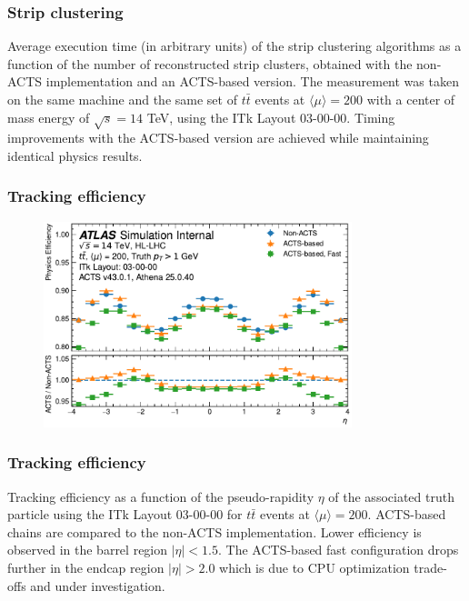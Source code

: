 \documentclass[aspectratio=169]{beamer}
\begin{document}
\begin{frame}
\frametitle{Strip clustering}
Average execution time (in arbitrary units) of the strip clustering algorithms as a function of the number of reconstructed strip clusters, obtained with the non-ACTS implementation and an ACTS-based version. The measurement was taken on the same machine and the same set of $t\bar{t}$ events at $\langle \mu \rangle = 200$ with a center of mass energy of $\sqrt{s}=14$ TeV, using the ITk Layout 03-00-00. Timing improvements with the ACTS-based version are achieved while maintaining identical physics results.
\end{frame}


\begin{frame}
\frametitle{Tracking efficiency}
\begin{figure}[h]
    \centering
    \includegraphics[width=0.8\textwidth]{plots/tracking_efficiency_physics.pdf}
\end{figure}
\end{frame}

\begin{frame}
\frametitle{Tracking efficiency}
Tracking efficiency as a function of the pseudo-rapidity $\eta$ of the associated truth particle using the ITk Layout 03-00-00 for $t\bar{t}$ events at $\langle \mu \rangle = 200$. ACTS-based chains are compared to the non-ACTS implementation. Lower efficiency is observed in the barrel region $|\eta| < 1.5$. The ACTS-based fast configuration drops further in the endcap region $|\eta| > 2.0$ which is due to CPU optimization trade-offs and under investigation.
\end{frame}
\end{document}
